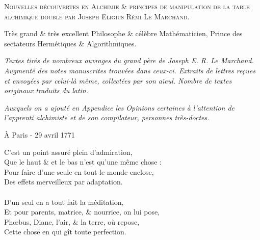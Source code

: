 \newpage

\thispagestyle{empty}

\newlength{\savedparindent}
\setlength{\savedparindent}{\parindent}

\setlength{\parindent}{-4em}


\fontsize{25pt}{25pt}\selectfont{}
\begin{center}
\textsc{Nouvelles découvertes en Alchimie \& principes de manipulation de la
table alchimique double par Joseph Eligius Rémi Le Marchand.}

\vspace*{1cm}

\fontsize{20pt}{20pt}\selectfont{}
Très grand \& très excellent Philosophe \& célèbre Mathématicien, Prince des
sectateurs Hermétiques \& Algorithmiques.

\vspace*{1cm}

\textit{Textes tirés de nombreux ouvrages du grand père de Joseph E. R. Le
    Marchand.
Augmenté des notes manuscrites trouvées dans ceux-ci.  Extraits de lettres
reçues et envoyées par celui-là même, collectées par son aïeul.  Nombre de
textes originaux traduits du latin.  }

\textit{Auxquels on a ajouté en Appendice les Opinions certaines à l'attention
de l'apprenti alchimiste et de son compilateur, personnes très-doctes.}
\end{center}
\setlength{\parindent}{\savedparindent}

\fontsize{15pt}{15pt}\selectfont{}
\begin{flushright}
À Paris - 29 avril 1771
\end{flushright}

\newpage

\normalsize


\noindent{}C'est un point assuré plein d'admiration,\\
Que le haut \& et le bas n'est qu'une même chose :\\
Pour faire d'une seule en tout le monde enclose,\\
Des effets merveilleux par adaptation.\\
\\
D'un seul en a tout fait la méditation,\\
Et pour parents, matrice, \& nourrice, on lui pose,\\
Phœbus, Diane, l'air, \& la terre, où repose,\\
Cette chose en qui gît toute perfection.\\

